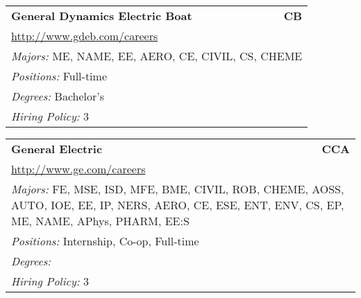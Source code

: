 \documentclass[twoside]{article}
\begin{document}
\begin{center}
\begin{multicols}{3}
\begin{FlushLeft}
\begin{minipage}{\columnwidth}
\end{minipage}
 
\begin{minipage}{\columnwidth}\begin{tabularx}{.95\columnwidth}{Xr}
                 {\Large\bf General Dynamics Electric Boat} & {\Large\bf CB}\\
    \multicolumn{2}{p{.95\columnwidth}}{\url{http://www.gdeb.com/careers}}\\
    \multicolumn{2}{p{.95\columnwidth}}{\emph{Majors:} ME, NAME, EE, AERO, CE, CIVIL, CS, CHEME}\\
    \multicolumn{2}{p{.95\columnwidth}}{\emph{Positions:} Full-time}\\
    \multicolumn{2}{p{.95\columnwidth}}{\emph{Degrees:} Bachelor's}\\
    \multicolumn{2}{p{.95\columnwidth}}{\emph{Hiring Policy:} 3}\\
    \end{tabularx}
    
\end{minipage}
 
\begin{minipage}{\columnwidth}\begin{tabularx}{.95\columnwidth}{Xr}
                 {\Large\bf General Electric} & {\Large\bf CCA}\\
    \multicolumn{2}{p{.95\columnwidth}}{\url{http://www.ge.com/careers}}\\
    \multicolumn{2}{p{.95\columnwidth}}{\emph{Majors:} FE, MSE, ISD, MFE, BME, CIVIL, ROB, CHEME, AOSS, AUTO, IOE, EE, IP, NERS, AERO, CE, ESE, ENT, ENV, CS, EP, ME, NAME, APhys, PHARM, EE:S}\\
    \multicolumn{2}{p{.95\columnwidth}}{\emph{Positions:} Internship, Co-op, Full-time}\\
    \multicolumn{2}{p{.95\columnwidth}}{\emph{Degrees:} }\\
    \multicolumn{2}{p{.95\columnwidth}}{\emph{Hiring Policy:} 3}\\
    \end{tabularx}
    
\end{minipage}
 

\end{FlushLeft}
\end{multicols}
\end{center}
\end{document}

